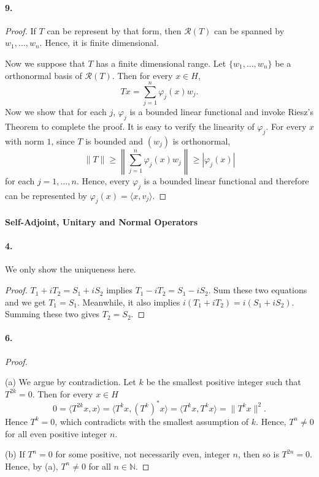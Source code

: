   \paragraph{9.}
  \begin{proof}
    If $T$ can be represent by that form, then $\mathcal{R}(T)$ can be spanned
    by $w_1,\dots,w_n$. Hence, it is finite dimensional.\par
    Now we suppose that $T$ has a finite dimensional range. Let $\{w_1,\dots,
    w_n\}$ be a orthonormal basis of $\mathcal{R}(T)$. Then for every $x\in H$,
    \[
      Tx=\sum_{j=1}^n\varphi_j(x)w_j.
    \]
    Now we show that for each $j$, $\varphi_j$ is a bounded linear functional
    and invoke Riesz's Theorem to complete the proof. It is easy to verify the
    linearity of $\varphi_j$. For every $x$ with norm $1$, since $T$ is bounded
    and $(w_j)$ is orthonormal,
    \[
      \|T\|\ge\left\|\sum_{j=1}^n\varphi_j(x)w_j\right\|\ge |\varphi_j(x)|
    \]
    for each $j=1,\dots,n$. Hence, every $\varphi_j$ is a bounded linear 
    functional and therefore can be represented by $\varphi_j(x)=\langle x,v_j
    \rangle$.
  \end{proof}

\paragraph{Self-Adjoint, Unitary and Normal Operators}
  \paragraph{4.}
    We only show the uniqueness here.
  \begin{proof}
    $T_1+iT_2=S_1+iS_2$ implies $T_1-iT_2=S_1-iS_2$. Sum these two equations and
    we get $T_1=S_1$. Meanwhile, it also implies $i(T_1+iT_2)=i(S_1+iS_2)$. 
    Summing these two gives $T_2=S_2$.
  \end{proof}
  
  \paragraph{6.}
  \begin{proof}
    $\,$\par
    (a) We argue by contradiction. Let $k$ be the smallest positive integer such
    that $T^{2k}=0$. Then for every $x\in H$
    \[
      0=\langle T^{2k}x,x\rangle = \langle T^kx,(T^k)^*x\rangle=
      \langle T^kx,T^kx\rangle=\|T^kx\|^2.
    \]
    Hence $T^k=0$, which contradicts with the smallest assumption of $k$. Hence,
    $T^n\ne 0$ for all even positive integer $n$.\par
    (b) If $T^n=0$ for some positive, not necessarily even, integer $n$, then so
    is $T^{2n}=0$. Hence, by (a), $T^n\ne 0$ for all $n\in\mathbb{N}$.
  \end{proof}
  
